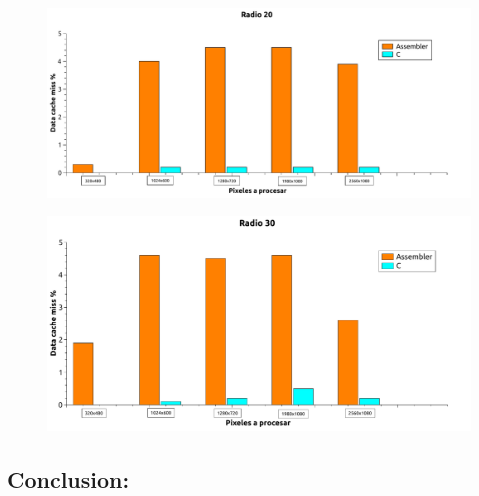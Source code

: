 \begin{figure}[H]
\begin{center}
  \includegraphics[width=\linewidth]{cache/Radio20.pdf}
\end{center}
\end{figure}

\begin{figure}[H]
\begin{center}
  \includegraphics[width=\linewidth]{cache/Radio30.pdf}
\end{center}
\end{figure}

\subsection{Conclusion:} 


